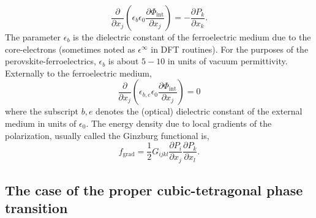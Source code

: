 \documentclass[22pt]{article} %
\begin{document}
%
$$\frac{\partial}{\partial x_j} \left( \epsilon_b \epsilon_0 \frac{\partial \Phi_\mathrm{int}}{\partial x_j}\right) = - \frac{\partial P_k}{\partial x_k}.$$
%
The parameter $\epsilon_b$ is the dielectric constant of the ferroelectric medium due to the core-electrons (sometimes noted as $\epsilon^\infty$ in DFT routines).
%
For the purposes of the perovskite-ferroelectrics, $\epsilon_b$ is about $5-10$ in units of vacuum permittivity. 
%
Externally to the ferroelectric medium, 
%
$$\frac{\partial}{\partial x_j} \left( \epsilon_{b,e} \epsilon_0 \frac{\partial \Phi_\mathrm{int}}{\partial x_j}\right) = 0$$
%
where the subscript $b,e$ denotes the (optical) dielectric constant of the external medium in units of $\epsilon_0$.
%
The energy density due to local gradients of the polarization, usually called the Ginzburg functional is, 
%
$$f_\mathrm{grad} = \frac{1}{2} G_{ijkl} \frac{\partial P_i}{\partial x_j} \frac{\partial P_k}{\partial x_l}.$$
%


%
\subsection{The case of the proper cubic-tetragonal phase transition}
%

%
\end{document}
